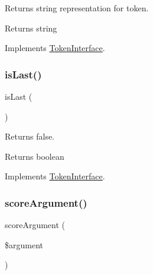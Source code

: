 Returns string representation for token.

\begin{DoxyReturn}{Returns}
string 
\end{DoxyReturn}


Implements \mbox{\hyperlink{interface_prophecy_1_1_argument_1_1_token_1_1_token_interface_a7516ca30af0db3cdbf9a7739b48ce91d}{Token\+Interface}}.

\mbox{\label{class_prophecy_1_1_argument_1_1_token_1_1_logical_and_token_ac72b8349b1340887fc1af30eca2b951c}} 
\subsubsection{\texorpdfstring{is\+Last()}{isLast()}}
{\footnotesize\ttfamily is\+Last (\begin{DoxyParamCaption}{ }\end{DoxyParamCaption})}

Returns false.

\begin{DoxyReturn}{Returns}
boolean 
\end{DoxyReturn}


Implements \mbox{\hyperlink{interface_prophecy_1_1_argument_1_1_token_1_1_token_interface_ac72b8349b1340887fc1af30eca2b951c}{Token\+Interface}}.

\mbox{\label{class_prophecy_1_1_argument_1_1_token_1_1_logical_and_token_a8d5bf47ab6eaa935458d5ad160e52822}} 
\subsubsection{\texorpdfstring{score\+Argument()}{scoreArgument()}}
{\footnotesize\ttfamily score\+Argument (\begin{DoxyParamCaption}\item[{}]{\$argument }\end{DoxyParamCaption})}

